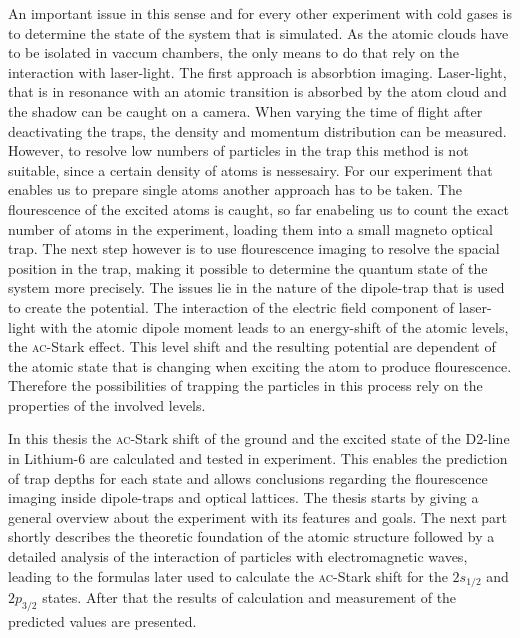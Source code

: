 An important issue in this sense and for every other experiment with cold gases is to determine the state of the system that is simulated. As the atomic clouds have to be isolated in vaccum chambers, the only means to do that rely on the interaction with laser-light. The first approach is absorbtion imaging\cite{ketterle}. Laser-light, that is in resonance with an atomic transition is absorbed by the atom cloud and the shadow can be caught on a camera. When varying the time of flight after deactivating the traps, the density and momentum distribution can be measured. However, to resolve low numbers of particles in the trap this method is not suitable, since a certain density of atoms is nessesairy. For our experiment that enables us to prepare single atoms another approach has to be taken. The flourescence of the excited atoms is caught, so far enabeling us to count the exact number of atoms in the experiment, loading them into a small magneto optical trap. The next step however is to use flourescence imaging to resolve the spacial position in the trap, making it possible to determine the quantum state of the system more precisely. The issues lie in the nature of the dipole-trap that is used to create the potential. The interaction of the electric field component of laser-light with the atomic dipole moment leads to an energy-shift of the atomic levels, the \textsc{ac}-Stark effect. This level shift and the resulting potential are dependent of the atomic state that is changing when exciting the atom to produce flourescence. Therefore the possibilities of trapping the particles in this process rely on the properties of the involved levels. 

In this thesis the \textsc{ac}-Stark shift of the ground and the excited state of the D2-line in Lithium-6 are calculated and tested in experiment. This enables the prediction of trap depths for each state and allows conclusions regarding the flourescence imaging inside dipole-traps and optical lattices. The thesis starts by giving a general overview about the experiment with its features and goals. The next part shortly describes the theoretic foundation of the atomic structure followed by a detailed analysis of the interaction of particles with electromagnetic waves, leading to the formulas later used to calculate the \textsc{ac}-Stark shift for the $2s_{1/2}$ and $2p_{3/2}$ states. After that the results of calculation and measurement of the predicted values are presented.

